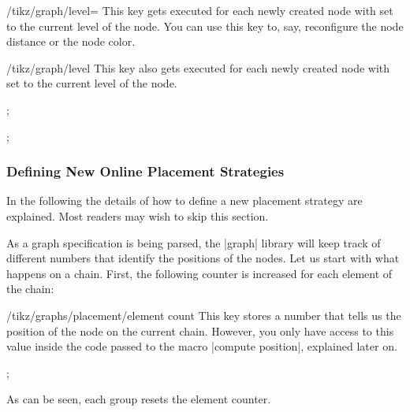 \begin{stylekey}{/tikz/graph/level=}
  This key gets executed for each newly created node with 
  set to the current level of the node. You can use this key to, say,
  reconfigure the node distance or the node color.
\end{stylekey}

\begin{stylekey}{/tikz/graph/level }
  This key also gets executed for each newly created node with
   set to the current level of the node.
\begin{codeexample}[]
\tikz {};
\end{codeexample}
\begin{codeexample}[]
\tikz {};
\end{codeexample}
\end{stylekey}



\subsubsection{Defining New Online Placement Strategies}

\label{section-library-graphs-new-online}

In the following the details of how to define a new placement strategy
are explained. Most readers may wish to skip this section.

As a graph specification is being parsed, the |graph| library will keep
track of different numbers that identify the positions of the
nodes. Let us start with what happens on a chain. First, the following 
counter is increased for each element of the chain:
\begin{key}{/tikz/graphs/placement/element count}
  This key stores a number that tells us the position of the node on
  the current chain. However, you only have access to this value
  inside the code passed to the macro |compute position|, explained
  later on.
\begin{codeexample}[]
\tikz {};
\end{codeexample}
  As can be seen, each group resets the element counter.
\end{key}

